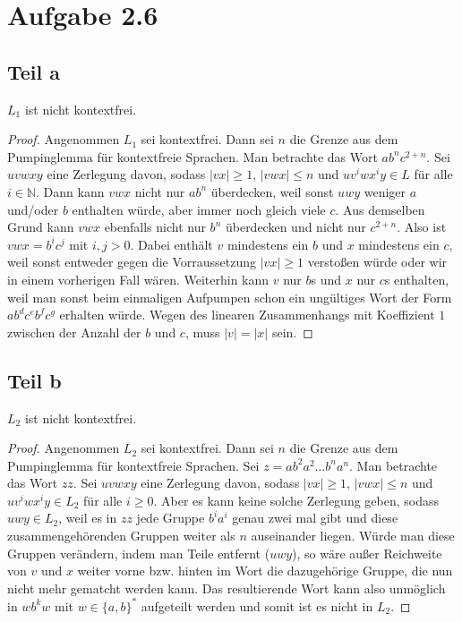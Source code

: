 \documentclass[10pt,a4paper]{article}
\begin{document}
\section{Aufgabe 2.6}

\subsection{Teil a}

$L_{1}$ ist nicht kontextfrei.
\begin{proof}
  Angenommen $L_{1}$ sei kontextfrei.
  Dann sei $n$ die Grenze aus dem Pumpinglemma für kontextfreie Sprachen.
  Man betrachte das Wort $ab^{n}c^{2 + n}$.
  Sei $uvwxy$ eine Zerlegung davon, sodass $|vx| \ge 1$, $|vwx| \le n$ und $uv^iwx^iy \in L$ für alle $i \in{\mathbb{N}}$.
  Dann kann $vwx$ nicht nur $ab^{n}$ überdecken, weil sonst $uwy$ weniger $a$ und/oder $b$ enthalten würde, aber immer noch gleich viele $c$.
  Aus demselben Grund kann $vwx$ ebenfalls nicht nur $b^{n}$ überdecken und nicht nur $c^{2 + n}$.
  Also ist $vwx = b^{i}c^{j}$ mit $i, j > 0$.
  Dabei enthält $v$ mindestens ein $b$ und $x$ mindestens ein $c$, weil sonst entweder gegen die Vorraussetzung $|vx| \ge 1$ verstoßen würde oder wir in einem vorherigen Fall wären.
  Weiterhin kann $v$ nur $b$s und $x$ nur $c$s enthalten, weil man sonst beim einmaligen Aufpumpen schon ein ungültiges Wort der Form $ab^{d}c^{e}b^{f}c^{g}$ erhalten würde.
  Wegen des linearen Zusammenhangs mit Koeffizient $1$ zwischen der Anzahl der $b$ und $c$, muss $|v| = |x|$ sein.

\end{proof}

\subsection{Teil b}

$L_{2}$ ist nicht kontextfrei.
\begin{proof}
  Angenommen $L_{2}$ sei kontextfrei.
  Dann sei $n$ die Grenze aus dem Pumpinglemma für kontextfreie Sprachen.
  Sei $z = ab^{2}a^{2}\dots b^{n}a^{n}$.
  Man betrachte das Wort $zz$.
  Sei $uvwxy$ eine Zerlegung davon, sodass $|vx| \ge 1$, $|vwx| \le n$ und $uv^{i}wx^{i}y \in L_{2}$ für alle $i \ge 0$.
  Aber es kann keine solche Zerlegung geben, sodass $uwy \in L_{2}$, weil es in $zz$ jede Gruppe $b^{i}a^{i}$ genau zwei mal gibt und diese zusammengehörenden Gruppen weiter als $n$ auseinander liegen.
  Würde man diese Gruppen verändern, indem man Teile entfernt ($uwy$), so wäre außer Reichweite von $v$ und $x$ weiter vorne bzw. hinten im Wort die dazugehörige Gruppe, die nun nicht mehr gematcht werden kann.
  Das resultierende Wort kann also unmöglich in $wb^{k}w$ mit $w \in \{ a, b \}^{*}$ aufgeteilt werden und somit ist es nicht in $L_{2}$.
\end{proof}
\end{document}
